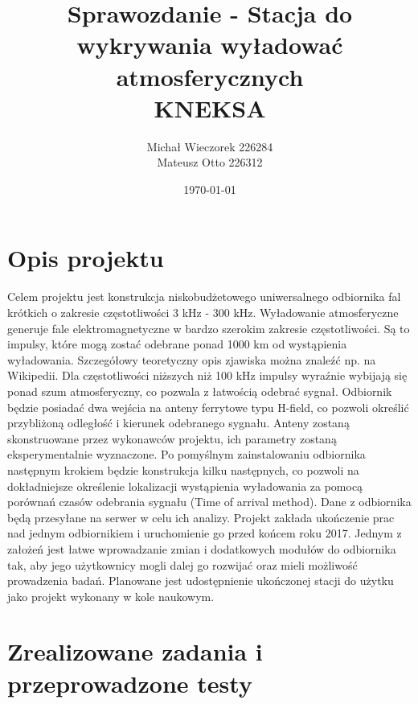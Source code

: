 \documentclass[12pt]{article}
\title{\textbf{Sprawozdanie - Stacja do wykrywania wyładować atmosferycznych}\\KNEKSA}
\author{Michał Wieczorek {226284}\\ Mateusz Otto {226312}}
\date{\today}
\begin{document}
\maketitle
\newpage
\section{Opis projektu}
Celem projektu jest konstrukcja niskobudżetowego uniwersalnego odbiornika fal krótkich o zakresie częstotliwości 3 kHz - 300 kHz. Wyładowanie atmosferyczne generuje fale elektromagnetyczne w bardzo szerokim zakresie częstotliwości. Są to impulsy, które mogą zostać odebrane ponad 1000 km od wystąpienia wyładowania. Szczegółowy teoretyczny opis zjawiska można znaleźć np. na Wikipedii. Dla częstotliwości niższych niż 100 kHz impulsy wyraźnie wybijają się ponad szum atmosferyczny, co pozwala z łatwością odebrać sygnał. Odbiornik będzie posiadać dwa wejścia na anteny ferrytowe typu H-field, co pozwoli określić przybliżoną odległość i kierunek odebranego sygnału. Anteny zostaną skonstruowane przez wykonawców projektu, ich parametry zostaną eksperymentalnie wyznaczone. Po pomyślnym zainstalowaniu odbiornika następnym krokiem będzie konstrukcja kilku następnych, co pozwoli na dokładniejsze określenie lokalizacji wystąpienia wyładowania za pomocą porównań czasów odebrania sygnału (Time of arrival method). Dane z odbiornika będą przesyłane na serwer w celu ich analizy. Projekt zakłada ukończenie prac nad jednym odbiornikiem i uruchomienie go przed końcem roku 2017. Jednym z założeń jest łatwe wprowadzanie zmian i dodatkowych modułów do odbiornika tak, aby jego użytkownicy mogli dalej go rozwijać oraz mieli możliwość prowadzenia badań. Planowane jest udostępnienie ukończonej stacji do użytku jako projekt wykonany w kole naukowym.

\section{Zrealizowane zadania i przeprowadzone testy}
\end{document}
